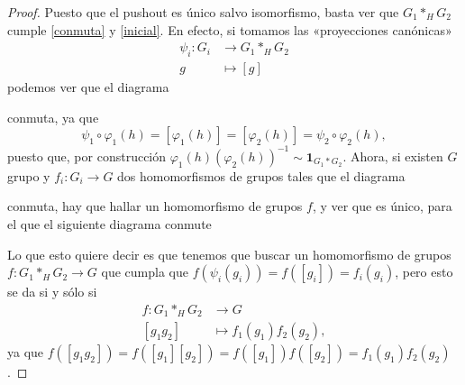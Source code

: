 \documentclass[12pt,a4paper]{book}
\theoremstyle{definition} \newtheorem{defn}[thm]{Definición}
\theoremstyle{definition} \newtheorem{ejemplo}[thm]{Ejemplo}
\theoremstyle{definition} \newtheorem{ejercicio}[thm]{Ejercicio}
\theoremstyle{remark} \newtheorem*{obs}{Observación}
\begin{document}
\begin{proof}
  Puesto que el pushout es único salvo isomorfismo, basta ver que $G_1*_H G_2$ cumple \ref{conmuta} y \ref{inicial}. En efecto, si tomamos las «proyecciones canónicas»
\begin{align*}
  \psi_i :G_i&\longrightarrow G_1*_H G_2\\ 
  g &\longmapsto [g] 
  \end{align*}
  podemos ver que el diagrama
    \begin{center}
  \end{center}
  conmuta, ya que
  \begin{equation*}
    \psi_1 \circ \varphi_1 (h) = [\varphi_1(h)]=[\varphi_2(h)]=\psi_2 \circ \varphi_2 (h),
  \end{equation*}
  puesto que, por construcción $\varphi_1(h)(\varphi_2(h))^{-1}\sim \mathbf{1}_{G_1*G_2}$. Ahora, si existen $G$ grupo y  $f_i:G_i \rightarrow G$ dos homomorfismos de grupos tales que el diagrama 
    \begin{center}
  \end{center}
  conmuta, hay que hallar un homomorfismo de grupos $f$, y ver que es único, para el que el siguiente diagrama conmute
    \begin{center}
  \end{center}
  Lo que esto quiere decir es que tenemos que buscar un homomorfismo de grupos $f:G_1*_HG_2\rightarrow G$ que cumpla que $f(\psi_i(g_i))=f([g_i])=f_i(g_i)$, pero esto se da si y sólo si
  \begin{align*}
    f :G_1*_H G_2&\longrightarrow G\\ 
    [g_1g_2] &\longmapsto f_1(g_1)f_2(g_2), 
    \end{align*}
    ya que $f([g_1g_2])=f([g_1][g_2])=f([g_1])f([g_2])=f_1(g_1)f_2(g_2)$. 


\end{proof}
\end{document}
